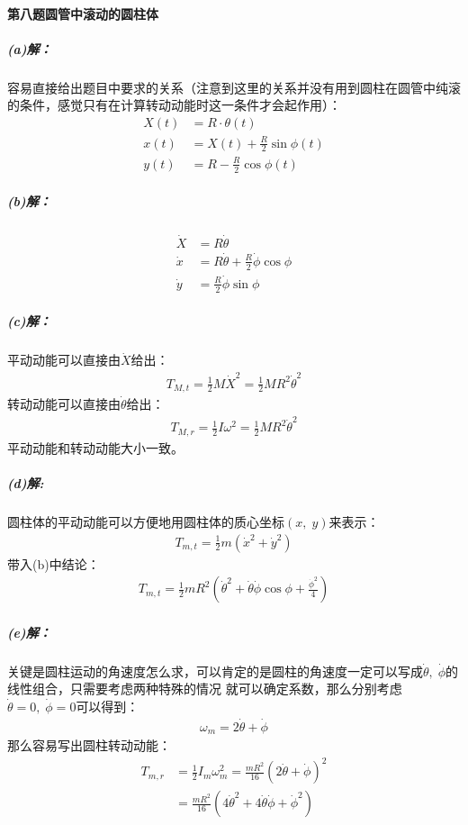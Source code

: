 \documentclass[a4paper]{ctexart}
\begin{document}
    \paragraph{第八题\;\;圆管中滚动的圆柱体}
    \subparagraph{(a)解：}
    容易直接给出题目中要求的关系（注意到这里的关系并没有用到圆柱在圆管中纯滚的条件，感觉只有在计算转动动能时这一条件才会起作用）：
    \begin{align}
        X(t) &= R\cdot\theta(t)\\
        x(t) &= X(t) + \frac{R}{2}\sin\phi(t)\\
        y(t) &= R - \frac{R}{2}\cos\phi(t)
    \end{align}
    \subparagraph{(b)解：}
    \begin{align}
        \dot{X} &= R\dot{\theta}\\
        \dot{x} &= R\dot{\theta} + \frac{R}{2}\dot{\phi}\cos\phi\\
        \dot{y} &= \frac{R}{2}\dot{\phi}\sin{\phi}
    \end{align}
    \subparagraph{(c)解：}
    平动动能可以直接由$\dot{X}$给出：
    \begin{align}
        T_{M,t} = \frac{1}{2}M\dot{X}^{2} = \frac{1}{2}MR^{2}\dot{\theta}^{2}
    \end{align}
    转动动能可以直接由$\dot{\theta}$给出：
    \begin{align}
        T_{M,r} = \frac{1}{2}I\omega^{2} = \frac{1}{2}MR^{2}\dot{\theta}^{2}
    \end{align}
    平动动能和转动动能大小一致。
    \subparagraph{(d)解:}
    圆柱体的平动动能可以方便地用圆柱体的质心坐标$(x,\;y)$来表示：
    \begin{align}
        T_{m,t} = \frac{1}{2}m(\dot{x}^{2} + \dot{y}^{2})
    \end{align}
    带入(b)中结论：
    \begin{align}
        T_{m,t} = \frac{1}{2}mR^{2}\left(\dot{\theta}^{2} + \dot{\theta}\dot{\phi}\cos\phi + \frac{\dot{\phi}^{2}}{4}\right)
    \end{align}
    \subparagraph{(e)解：}
    关键是圆柱运动的角速度怎么求，可以肯定的是圆柱的角速度一定可以写成$\dot{\theta},\;\dot{\phi}$的线性组合，只需要考虑两种特殊的情况
    就可以确定系数，那么分别考虑$\dot{\theta}=0,\;\dot{\phi}=0$可以得到： 
    \begin{align}
        \omega_{m} = 2\dot{\theta} + \dot{\phi}
    \end{align}
    那么容易写出圆柱转动动能：
    \begin{align}
        T_{m,r} &= \frac{1}{2}I_{m}\omega_{m}^{2} = \frac{mR^{2}}{16}(2\dot{\theta} + \dot{\phi})^{2}\\
        &= \frac{mR^{2}}{16}(4\dot{\theta}^{2} + 4\dot{\theta}\dot{\phi} + \dot{\phi}^{2})
    \end{align}
\end{document}
